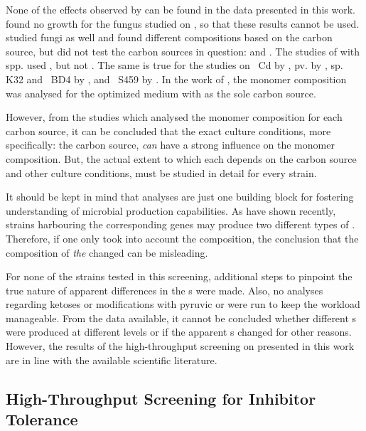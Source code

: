 None of the effects observed by \textcite{Kai2003} can be found in the data presented in this work. \textcite{Lee1995} found no growth for the fungus studied on \xyl{}, so that these results cannot be used. \textcite{Lee2007} studied fungi as well and found different \eps{} compositions based on the carbon source, but did not test the carbon sources in question: \glc{} and \xyl{}. The studies of \textcite{Grobben1996, Grobben1997, Cerning1994} with  spp. used \glc{}, but not \xyl{}. The same is true for the studies on ~Cd by \textcite{Fischer2003},  pv.  by \textcite{Osman1986},  sp. K32 and ~BD4 by \textcite{Bryan1986}, and ~S459 by \textcite{Tait1986}. In the work of \textcite{Raza2011}, the monomer composition was analysed for the optimized medium with \gal{} as the sole carbon source.

However, from the studies which analysed the monomer composition for each carbon source, it can be concluded that the exact culture conditions, more specifically: the carbon source, \textit{can} have a strong influence on the monomer composition. But, the actual extent to which each \eps{} depends on the carbon source and other culture conditions, must be studied in detail for every strain.

It should be kept in mind that \amc{} analyses are just one building block for fostering understanding of microbial \eps{} production capabilities. As \textcite{Ruetering2016} have shown recently, strains harbouring the corresponding genes \cite{Ruetering2017} may produce two different types of \eps{}. Therefore, if one only took into account the \eps{} composition, the conclusion that the composition of \textit{the} \eps{} changed can be misleading.

For none of the strains tested in this screening, additional steps to pinpoint the true nature of apparent differences in the \eps{} \amc{}s were made. Also, no analyses regarding ketoses or modifications with pyruvic or \acet{} were run to keep the workload manageable. From the data available, it cannot be concluded whether different \eps{}s were produced at different levels or if the apparent \amc{}s changed for other reasons. However, the results of the high-throughput screening on \xyl{} presented in this work are in line with the available scientific literature.

\subsection{High-Throughput Screening for Inhibitor Tolerance\label{subsec-lch-eps-disc-inh-tol}}
